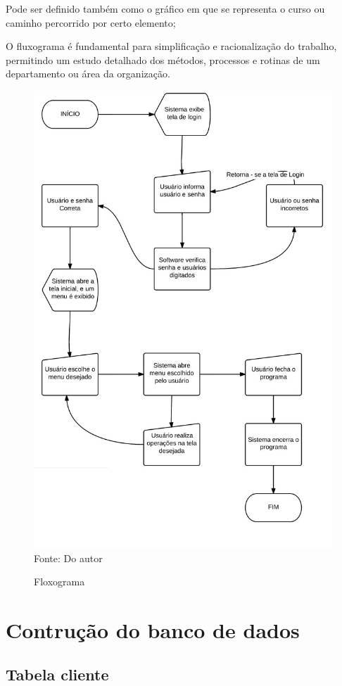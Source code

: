 Pode ser definido também como o gráfico em que se representa o curso ou caminho percorrido por certo elemento;

O fluxograma é fundamental para simplificação e racionalização do trabalho, permitindo um estudo detalhado dos métodos, processos e rotinas de um departamento ou área da organização. 


\begin{figure}[H]
	\centering 
	\caption{Floxograma}
	
	\label{loxograma}
	\includegraphics[scale = 0.70]{imagens/fluxo.jpg}
	\\Fonte: Do autor
\end{figure}

\newpage

\section{Contrução do banco de dados}
\subsection{Tabela cliente}
